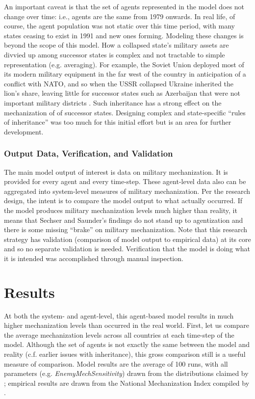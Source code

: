 \documentclass{article}
\begin{document}
An important caveat is that the set of agents represented in the model does not
change over time: i.e., agents are the same from 1979 onwards. In real life,
of course, the agent population was not static over this time period, with many
states ceasing to exist in 1991 and new ones forming. Modeling these changes is
beyond the scope of this model. How a collapsed state's military assets are divvied up
among successor states is complex and not tractable to simple representation
(e.g. averaging). For example, the Soviet Union deployed most of its modern
military equipment in the far west of the country in anticipation of a conflict
with NATO, and so when the USSR collapsed Ukraine inherited the lion's share, leaving
little for successor states such as Azerbaijan that were not important military
districts \citep{roy1993military}. Such inheritance has
a strong effect on the mechanization of of successor states. Designing
complex and state-specific ``rules of inheritance'' was too much for this
initial effort but is an area for further development.

\subsubsection{Output Data, Verification, and Validation}

The main model output of interest is data on military mechanization. It is provided for
every agent and every time-step. These agent-level data also can be aggregated
into system-level measures of military mechanization. Per the research design,
the intent is to compare the model output to what actually occurred. If the
model produces military mechanization levels much higher than reality, it means
that Sechser and Saunder's findings do not stand up to agentization and there is
some missing ``brake'' on military mechanization. Note that this research
strategy has validation (comparison of model output to empirical data) at its
core and so no separate validation is needed. Verification that the model is
doing what it is intended was accomplished through manual inspection.

\section{Results}

At both the system- and agent-level, this agent-based model results in much
higher mechanization levels than occurred in the real world. First, let us
compare the average mechanization levels across all countries at each time-step
of the model. Although the set of agents is not exactly the same between the
model and reality (c.f. earlier issues with inheritance), this
gross comparison still is a useful measure of comparison. Model results are
the average of 100 runs, with all parameters (e.g.
\textit{EnemyMechSensitivity}) drawn from the distributions claimed by
\citet{sechser2010army}; empirical results are drawn from the National
Mechanization Index compiled by \citet{sechser2010army}.
\end{document}
